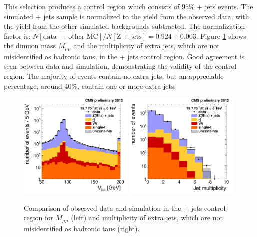 This selection produces a control region which consists of $95\%$ \Z + jets events. The simulated \Z + jets sample is normalized to the yield from the observed data, with the yield from the other simulated backgrounds subtracted. The normalization factor is: $N[\text{data}~-~\text{other MC}]/N[\text{Z + jets}] = 0.924 \pm 0.003$. Figure \ref{Bkg:fig:Zregion} shows the dimuon mass $M_{\mu\mu}$ and the multiplicity of extra jets, which are not misidentified as hadronic taus, in the \Zmm + jets control region. Good agreement is seen between data and simulation, demonstrating the validity of the control region. The majority of events contain no extra jets, but an appreciable percentage, around $40\%$, contain one or more extra jets.

\begin{figure}[hbt]
  \begin{center}
    \includegraphics[width=0.49\textwidth]{figures/bkgEstim/massdimuon.pdf}
    \includegraphics[width=0.49\textwidth]{figures/bkgEstim/njet.pdf}
    \caption{Comparison of observed data and simulation in the \Zmm + jets control region for $M_{\mu\mu}$ (left) and multiplicity of extra jets, which are not misidentified as hadronic taus (right). \label{Bkg:fig:Zregion}}
  \end{center}
\end{figure}

